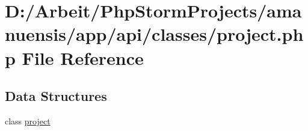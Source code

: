 \hypertarget{a00070}{}\section{D\+:/\+Arbeit/\+Php\+Storm\+Projects/amanuensis/app/api/classes/project.php File Reference}
\label{a00070}
\subsection*{Data Structures}
\begin{DoxyCompactItemize}
\item 
class \hyperlink{a00036}{project}
\end{DoxyCompactItemize}
